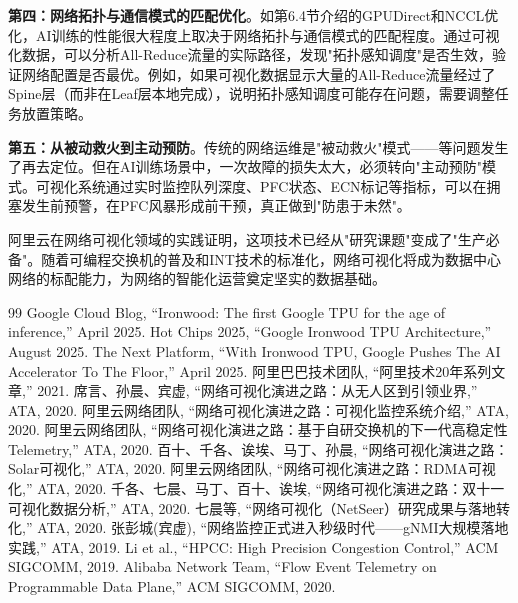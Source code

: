 \textbf{第四：网络拓扑与通信模式的匹配优化}。如第6.4节介绍的GPUDirect和NCCL优化，AI训练的性能很大程度上取决于网络拓扑与通信模式的匹配程度。通过可视化数据，可以分析All-Reduce流量的实际路径，发现"拓扑感知调度"是否生效，验证网络配置是否最优。例如，如果可视化数据显示大量的All-Reduce流量经过了Spine层（而非在Leaf层本地完成），说明拓扑感知调度可能存在问题，需要调整任务放置策略。

\textbf{第五：从被动救火到主动预防}。传统的网络运维是"被动救火"模式——等问题发生了再去定位。但在AI训练场景中，一次故障的损失太大，必须转向"主动预防"模式。可视化系统通过实时监控队列深度、PFC状态、ECN标记等指标，可以在拥塞发生前预警，在PFC风暴形成前干预，真正做到"防患于未然"。

阿里云在网络可视化领域的实践证明，这项技术已经从"研究课题"变成了"生产必备"。随着可编程交换机的普及和INT技术的标准化，网络可视化将成为数据中心网络的标配能力，为网络的智能化运营奠定坚实的数据基础。

\begin{thebibliography}{99}
 Google Cloud Blog, ``Ironwood: The first Google TPU for the age of inference,'' April 2025.
 Hot Chips 2025, ``Google Ironwood TPU Architecture,'' August 2025.
 The Next Platform, ``With Ironwood TPU, Google Pushes The AI Accelerator To The Floor,'' April 2025.
 阿里巴巴技术团队, ``阿里技术20年系列文章,'' 2021.
 席言、孙晨、宾虚, ``网络可视化演进之路：从无人区到引领业界,'' ATA, 2020.
 阿里云网络团队, ``网络可视化演进之路：可视化监控系统介绍,'' ATA, 2020.
 阿里云网络团队, ``网络可视化演进之路：基于自研交换机的下一代高稳定性Telemetry,'' ATA, 2020.
 百十、千各、诶埃、马丁、孙晨, ``网络可视化演进之路：Solar可视化,'' ATA, 2020.
 阿里云网络团队, ``网络可视化演进之路：RDMA可视化,'' ATA, 2020.
 千各、七晨、马丁、百十、诶埃, ``网络可视化演进之路：双十一可视化数据分析,'' ATA, 2020.
 七晨等, ``网络可视化（NetSeer）研究成果与落地转化,'' ATA, 2020.
 张彭城(宾虚), ``网络监控正式进入秒级时代——gNMI大规模落地实践,'' ATA, 2019.
 Li et al., ``HPCC: High Precision Congestion Control,'' ACM SIGCOMM, 2019.
 Alibaba Network Team, ``Flow Event Telemetry on Programmable Data Plane,'' ACM SIGCOMM, 2020.
\end{thebibliography}
